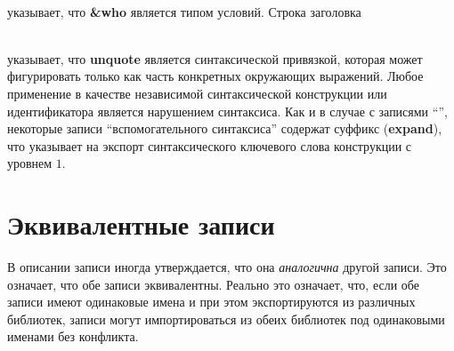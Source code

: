 \noindent{}\\
указывает, что {\bfseries\cf\&who} является типом условий. Строка заголовка

\noindent{}\\
указывает, что {\bfseries\cf unquote} является синтаксической привязкой, которая может
фигурировать только как часть конкретных окружающих выражений. Любое применение
в качестве независимой синтаксической конструкции или идентификатора является нарушением
синтаксиса. Как и в случае с записями ``\exprtype'', некоторые записи ``вспомогательного синтаксиса''
содержат суффикс ({\bfseries\cf expand}), что указывает на экспорт синтаксического ключевого слова
конструкции с уровнем $1$.\vspace{1mm}

\section {Эквивалентные записи}\vspace{1mm}

В описании записи иногда утверждается, что она \textit{аналогична} другой записи. Это
означает, что обе записи эквивалентны. Реально это означает, что, если обе записи имеют
одинаковые имена и при этом экспортируются из различных библиотек, записи
могут импортироваться из обеих библиотек под одинаковыми именами без конфликта.\vspace{1mm}

